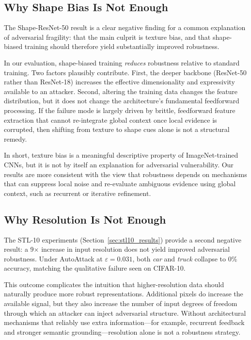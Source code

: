\documentclass[12pt,a4paper]{article}
\begin{document}
\subsection{Why Shape Bias Is Not Enough}

The Shape-ResNet-50 result is a clear negative finding for a common explanation
of adversarial fragility: that the main culprit is texture bias, and that
shape-biased training should therefore yield substantially improved robustness.

In our evaluation, shape-biased training \textit{reduces} robustness relative to
standard training. Two factors plausibly contribute. First, the deeper backbone
(ResNet-50 rather than ResNet-18) increases the effective dimensionality and
expressivity available to an attacker. Second, altering the training data changes
the feature distribution, but it does not change the architecture's fundamental
feedforward processing. If the failure mode is largely driven by brittle,
feedforward feature extraction that cannot re-integrate global context once local
evidence is corrupted, then shifting from texture to shape cues alone is not a
structural remedy.

In short, texture bias is a meaningful descriptive property of ImageNet-trained
CNNs, but it is not by itself an explanation for adversarial vulnerability. Our
results are more consistent with the view that robustness depends on mechanisms
that can suppress local noise and re-evaluate ambiguous evidence using global
context, such as recurrent or iterative refinement.

\subsection{Why Resolution Is Not Enough}

The STL-10 experiments (Section~\ref{sec:stl10_results}) provide a second
negative result: a 9$\times$ increase in input resolution does not yield improved
adversarial robustness. Under AutoAttack at $\varepsilon{=}0.031$, both \emph{car}
and \emph{truck} collapse to 0\% accuracy, matching the qualitative failure seen
on CIFAR-10.

This outcome complicates the intuition that higher-resolution data should
naturally produce more robust representations. Additional pixels do increase the
available signal, but they also increase the number of input degrees of freedom
through which an attacker can inject adversarial structure. Without architectural
mechanisms that reliably use extra information---for example, recurrent feedback
and stronger semantic grounding---resolution alone is not a robustness strategy.
\end{document}
